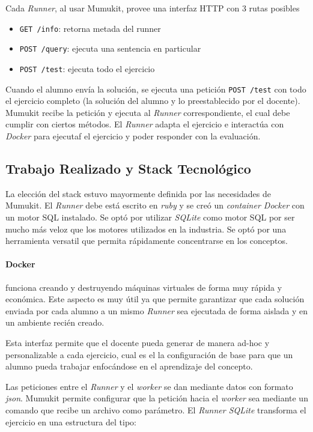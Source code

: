 Cada \textit{Runner}, al usar Mumukit, provee una interfaz HTTP con 3 rutas posibles

\begin{itemize}
    \item \texttt{GET /info}: retorna metada del runner
    \item \texttt{POST /query}: ejecuta una sentencia en particular
    \item \texttt{POST /test}: ejecuta todo el ejercicio
\end{itemize}

Cuando el alumno envía la solución, se ejecuta una petición
\texttt{POST /test} con todo el ejercicio completo (la solución
del alumno y lo preestablecido por el docente). Mumukit
recibe la petición y ejecuta al \textit{Runner} correspondiente,
el cual debe cumplir con ciertos métodos. El \textit{Runner}
adapta el ejercicio e interactúa con \textit{Docker} para
ejecutaf el ejercicio y poder responder con la evaluación.


\subsection{Trabajo Realizado y Stack Tecnológico}

La elección del stack estuvo mayormente definida por las necesidades
de Mumukit. El \textit{Runner} debe está escrito en \textit{ruby}
y se creó un \textit{container Docker} con un motor SQL instalado.
Se optó por utilizar \textit{SQLite} como motor SQL
por ser mucho más veloz que los motores utilizados en
la industria. Se optó por una herramienta versatil
que permita rápidamente concentrarse en los conceptos.

\paragraph{Docker} funciona creando y destruyendo
máquinas virtuales de forma muy rápida y económica.
Este aspecto es muy útil ya que permite garantizar
que cada solución enviada por cada alumno a un
mismo \textit{Runner} sea ejecutada de forma aislada
y en un ambiente recién creado.

Esta interfaz permite que el docente pueda
generar de manera ad-hoc y personalizable
a cada ejercicio, cual es el la configuración de base
para que un alumno pueda trabajar enfocándose
en el aprendizaje del concepto.

Las peticiones entre el \textit{Runner} y el \textit{worker}
se dan mediante datos con formato \textit{json}.
Mumukit permite configurar que la petición hacia el \textit{worker}
sea mediante un comando que recibe un archivo como parámetro.
El \textit{Runner SQLite} transforma el ejercicio en una estructura
del tipo:

